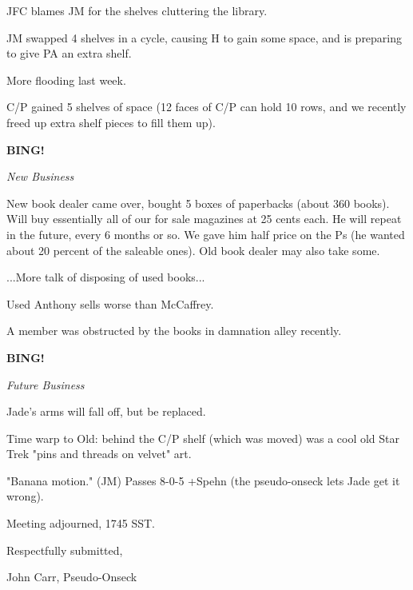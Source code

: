 \documentclass[12pt]{article}
\newcommand{\bing}{{\bf BING!} }
\newcommand{\goto}[1]{\bing \vskip 12pt \centerline{{\em{#1}}}}
\begin{document}
JFC blames JM for the shelves cluttering the library.

JM swapped 4 shelves in a cycle, causing H to gain some space, and is preparing to give PA an extra shelf.

More flooding last week.

C/P gained 5 shelves of space (12 faces of C/P can hold 10 rows, and we recently freed up extra shelf pieces to fill them up).

\goto{New Business}

New book dealer came over, bought 5 boxes of paperbacks (about 360 books). Will buy essentially all of our for sale magazines at 25 cents each. He will repeat in the future, every 6 months or so. We gave him half price on the Ps (he wanted about 20 percent of the saleable ones). Old book dealer may also take some.

...More talk of disposing of used books...

Used Anthony sells worse than McCaffrey.

A member was obstructed by the books in damnation alley recently.

\goto{Future Business}

Jade's arms will fall off, but be replaced.

Time warp to Old: behind the C/P shelf (which was moved) was a cool old Star Trek "pins and threads on velvet" art.

"Banana motion." (JM) Passes 8-0-5 +Spehn (the pseudo-onseck lets Jade get it wrong).

\vspace{12pt}

\noindent
Meeting adjourned, 1745 SST.

\vspace{18pt}

\centerline{Respectfully submitted,}
\centerline{John Carr, Pseudo-Onseck}
\end{document}
